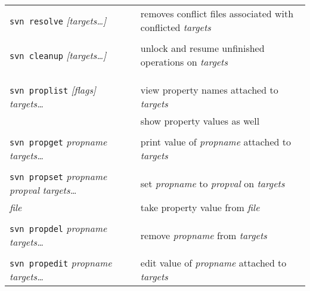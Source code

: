 \documentclass{report}
\begin{document}
\begin{tabular}{ll}
\\
{\tt svn resolve} {\sl [targets\dots]}	&
removes conflict files associated with conflicted {\sl targets}   \\

\\
{\tt svn cleanup} {\sl [targets\dots]}	&
unlock and resume unfinished operations on {\sl targets}   \\


\\
\\
\vspace{0.1in} \hspace{-0.1in}{\bf\Large Metadata}  \\

{\tt svn proplist} {\sl [flags]} {\sl targets\dots}    &
view property names attached to {\sl targets}     \\

\hspace{0.5in}{\tt -v}		&
show property values as well	 \\

\\
{\tt svn propget} {\sl propname} {\sl targets\dots}    &
print value of {\sl propname} attached to {\sl targets}     \\

\\
{\tt svn propset} {\sl propname} {\sl propval} {\sl targets\dots}    &
set {\sl propname} to {\sl propval} on {\sl targets}     \\

\hspace{0.5in}{\tt -F} {\sl file}		&
take property value from {\sl file}	 \\

\\
{\tt svn propdel} {\sl propname} {\sl targets\dots}    &
remove {\sl propname} from {\sl targets}     \\

\\
{\tt svn propedit} {\sl propname} {\sl targets\dots}    &
edit value of {\sl propname} attached to {\sl targets}     \\



\end{tabular}
\end{document}
